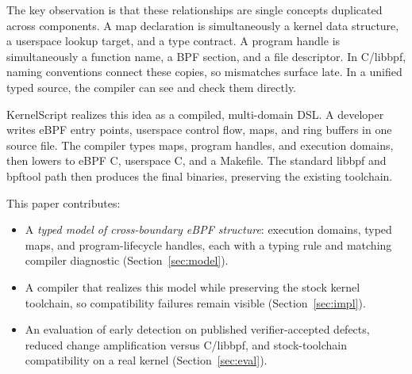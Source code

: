 \documentclass[sigplan,10pt,nonacm]{acmart}
\newcommand{\tool}{KernelScript}
\begin{document}
The key observation is that these relationships are single concepts duplicated across components.
A map declaration is simultaneously a kernel data structure, a userspace lookup target, and a type contract.
A program handle is simultaneously a function name, a BPF section, and a file descriptor.
In C/libbpf, naming conventions connect these copies, so mismatches surface late.
In a unified typed source, the compiler can see and check them directly.

\tool{} realizes this idea as a compiled, multi-domain DSL.
A developer writes eBPF entry points, userspace control flow, maps, and ring buffers in one source file.
The compiler types maps, program handles, and execution domains, then lowers to eBPF C, userspace C, and a Makefile.
The standard libbpf and bpftool path then produces the final binaries, preserving the existing toolchain.

This paper contributes:
\begin{itemize}
\item A \emph{typed model of cross-boundary eBPF structure}: execution domains, typed maps, and program-lifecycle handles, each with a typing rule and matching compiler diagnostic (Section~\ref{sec:model}).
\item A compiler that realizes this model while preserving the stock kernel toolchain, so compatibility failures remain visible (Section~\ref{sec:impl}).
\item An evaluation of early detection on published verifier-accepted defects, reduced change amplification versus C/libbpf, and stock-toolchain compatibility on a real kernel (Section~\ref{sec:eval}).
\end{itemize}
\end{document}
